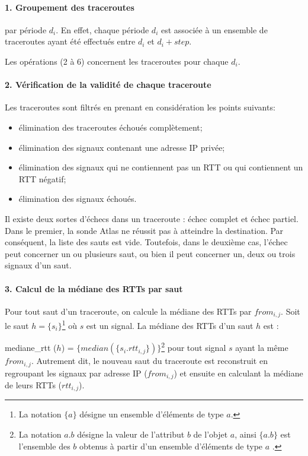 \paragraph{1. Groupement des traceroutes } par période $d_i$. En effet, chaque période $d_i$ est associée à un ensemble de traceroutes ayant été effectués entre $d_i$ et $d_i + step $. 

Les opérations  (2 à 6) concernent  les traceroutes pour chaque $d_i$.  

\paragraph{2. Vérification de la validité de chaque traceroute} 
Les traceroutes sont filtrés en prenant en considération  les points suivants:
\begin{itemize}
	\item élimination des traceroutes échoués complètement;
	\item élimination des signaux contenant une adresse IP privée;
	\item élimination des signaux qui ne contiennent pas un RTT ou  qui contiennent un RTT négatif;
	\item  élimination des signaux échoués.
\end{itemize}

Il existe deux sortes d'échecs dans un traceroute : échec complet et échec partiel. Dans le premier,   la sonde Atlas ne réussit pas à atteindre la destination. Par conséquent, la liste des sauts est vide. Toutefois, dans le deuxième cas, l'échec peut concerner un ou plusieurs saut, ou bien il peut concerner un, deux ou trois signaux d'un saut.


\paragraph{3. Calcul de la médiane des RTTs par saut} Pour tout saut d'un traceroute,  on calcule la médiane des RTTs par $from_{i,j}$. Soit le saut $h =\{s_i \}$\footnote{La notation $\{ a\}$ désigne un ensemble d'éléments de type $a$.} où $s$ est un  signal. La médiane des RTTs d'un saut $h$ est  :

mediane\_rtt ($h$) =  $\{median(\{s_i.rtt_{i, j}\})\}$\footnote{La notation $a.b$ désigne la valeur de l'attribut $b$ de l'objet $a$, ainsi $\{a.b\}$ est l'ensemble des $b$ obtenus à partir d'un ensemble d'éléments de type $a$ .}  pour tout signal $s$ ayant la même $from_{i,j}$. Autrement dit, le nouveau saut du traceroute est reconstruit en regroupant les signaux par adresse IP ($ from_{i, j} $) et ensuite en calculant la médiane de leurs RTTs ($rtt_{i,j}$). 




